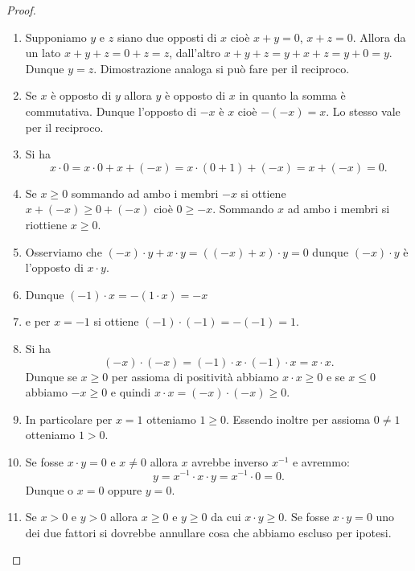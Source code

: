 \begin{proof}
\begin{enumerate}
\item
Supponiamo $y$ e $z$ siano due opposti di $x$ cioè $x+y=0$, $x+z=0$.
Allora da un lato $x+y+z = 0+z = z$, dall'altro $x+y+z = y+x+z= y+ 0 = y$.
Dunque $y=z$. Dimostrazione analoga si può fare per il reciproco.

\item
Se $x$ è opposto di $y$ allora $y$ è opposto di $x$ in quanto la somma
è commutativa. Dunque l'opposto di $-x$ è $x$ cioè $-(-x)=x$. Lo stesso
vale per il reciproco.

\item
Si ha
\[
x\cdot 0 = x \cdot 0 + x + (-x) %
=x\cdot(0+1) + (-x) = x + (-x) = 0.
\]

\item
Se $x\ge 0$ sommando ad ambo i membri $-x$ si ottiene $x+(-x) \ge 0 + (-x)$
cioè $0 \ge -x$. Sommando $x$ ad ambo i membri si riottiene $x\ge 0$.


\item
Osserviamo che $(-x)\cdot y + x\cdot y = ((-x)+x)\cdot y = 0$ dunque $(-x)\cdot y$ è l'opposto di $x\cdot y$.

\item
Dunque $(-1)\cdot x = - (1 \cdot x) = - x$

\item
e per $x=-1$ si ottiene $(-1)\cdot(-1) = -(-1) = 1$.

\item
Si ha
\[
(-x)\cdot(-x) = (-1)\cdot x \cdot (-1)\cdot x = x\cdot x.
\]
Dunque se $x\ge 0$ per assioma di positività
abbiamo $x\cdot x\ge 0$ e se $x\le 0$ abbiamo $-x\ge 0$ e quindi
$x\cdot x = (-x)\cdot(-x) \ge 0$.

\item
In particolare per $x=1$ otteniamo $1\ge 0$.
Essendo inoltre per assioma $0\neq 1$ otteniamo $1> 0$.

\item
Se fosse $x\cdot y = 0$ e $x\neq 0$ allora $x$ avrebbe inverso $x^{-1}$
e avremmo:
\[
  y = x^{-1} \cdot x \cdot y = x^{-1}\cdot 0 = 0.
\]
Dunque o $x=0$ oppure $y=0$.

\item
Se $x>0$ e $y>0$ allora $x\ge 0$ e $y\ge 0$ da cui $x\cdot y\ge 0$.
Se fosse $x\cdot y=0$ uno dei due fattori si dovrebbe annullare
cosa che abbiamo escluso per ipotesi.
\end{enumerate}
\end{proof}


